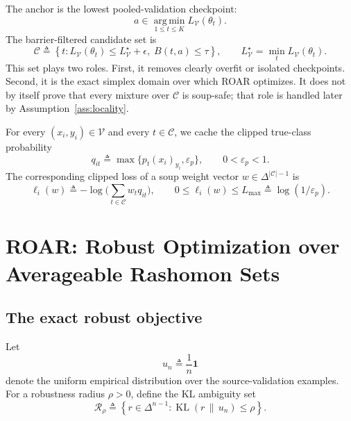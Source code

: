 \documentclass{article}
\newcommand{\cC}{\mathcal{C}}
\newcommand{\cR}{\mathcal{R}}
\newcommand{\cV}{\mathcal{V}}
\newcommand{\argmin}{\operatorname*{arg\,min}}
\newcommand{\KL}{\operatorname{KL}}
\newcommand{\simplex}{\Delta}
\newcommand{\roar}{\textup{\textsc{ROAR}}}
\newcommand{\ones}{\mathbf{1}}
\begin{document}
The anchor is the lowest pooled-validation checkpoint:
\begin{equation}
    a \in \argmin_{1\le t\le K} L_{\cV}(\theta_t).
    \label{eq:anchor}
\end{equation}
The barrier-filtered candidate set is
\begin{equation}
    \cC
    \triangleq
    \left\{
        t :
        L_{\cV}(\theta_t) \le L_{\cV}^{\star} + \epsilon,
        \;
        B(t,a)\le \tau
    \right\},
    \qquad
    L_{\cV}^{\star} = \min_t L_{\cV}(\theta_t).
    \label{eq:candidate_set}
\end{equation}
This set plays two roles. First, it removes clearly overfit or isolated checkpoints. Second, it is the exact simplex domain over which \roar{} optimizes. It does not by itself prove that every mixture over $\cC$ is soup-safe; that role is handled later by Assumption~\ref{ass:locality}.

For every $(x_i,y_i)\in\cV$ and every $t\in\cC$, we cache the clipped true-class probability
\begin{equation}
    q_{it}
    \triangleq
    \max\!\{p_t(x_i)_{y_i}, \varepsilon_p\},
    \qquad
    0<\varepsilon_p<1.
    \label{eq:qit}
\end{equation}
The corresponding clipped loss of a soup weight vector $w\in\simplex^{|\cC|-1}$ is
\begin{equation}
    \ell_i(w)
    \triangleq
    -\log\!\Big(\sum_{t\in\cC} w_t q_{it}\Big),
    \qquad
    0 \le \ell_i(w)\le L_{\max}\triangleq \log(1/\varepsilon_p).
    \label{eq:ell_i}
\end{equation}

\section{ROAR: Robust Optimization over Averageable Rashomon Sets}
\label{sec:method}

\subsection{The exact robust objective}

Let
\[
    u_n \triangleq \frac{1}{n}\ones
\]
denote the uniform empirical distribution over the source-validation examples. For a robustness radius $\rho>0$, define the KL ambiguity set
\begin{equation}
    \cR_{\rho}
    \triangleq
    \left\{
        r\in \simplex^{n-1} :
        \KL(r\,\|\,u_n)\le \rho
    \right\}.
    \label{eq:ambiguity_set}
\end{equation}
\end{document}
